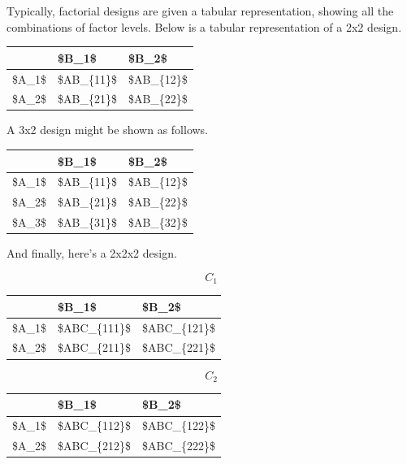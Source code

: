 \documentclass[]{book}
\begin{document}
Typically, factorial designs are given a tabular representation, showing all the combinations of factor levels. Below is a tabular representation of a 2x2 design.

\begin{table}[H]
\centering
\begin{tabular}{l|l|l}
\hline
  & \$B\_1\$ & \$B\_2\$\\
\hline
\$A\_1\$ & \$AB\_\{11\}\$ & \$AB\_\{12\}\$\\
\hline
\$A\_2\$ & \$AB\_\{21\}\$ & \$AB\_\{22\}\$\\
\hline
\end{tabular}
\end{table}

A 3x2 design might be shown as follows.

\begin{table}[H]
\centering
\begin{tabular}{l|l|l}
\hline
  & \$B\_1\$ & \$B\_2\$\\
\hline
\$A\_1\$ & \$AB\_\{11\}\$ & \$AB\_\{12\}\$\\
\hline
\$A\_2\$ & \$AB\_\{21\}\$ & \$AB\_\{22\}\$\\
\hline
\$A\_3\$ & \$AB\_\{31\}\$ & \$AB\_\{32\}\$\\
\hline
\end{tabular}
\end{table}

And finally, here's a 2x2x2 design.

\[C_1\]

\begin{table}[H]
\centering
\begin{tabular}{l|l|l}
\hline
  & \$B\_1\$ & \$B\_2\$\\
\hline
\$A\_1\$ & \$ABC\_\{111\}\$ & \$ABC\_\{121\}\$\\
\hline
\$A\_2\$ & \$ABC\_\{211\}\$ & \$ABC\_\{221\}\$\\
\hline
\end{tabular}
\end{table}

\[C_2\]

\begin{table}[H]
\centering
\begin{tabular}{l|l|l}
\hline
  & \$B\_1\$ & \$B\_2\$\\
\hline
\$A\_1\$ & \$ABC\_\{112\}\$ & \$ABC\_\{122\}\$\\
\hline
\$A\_2\$ & \$ABC\_\{212\}\$ & \$ABC\_\{222\}\$\\
\hline
\end{tabular}
\end{table}
\end{document}
